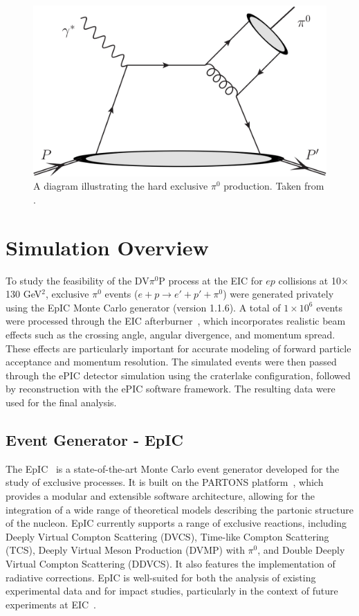 \documentclass[letterpaper,12pt]{article}
\begin{document}
\begin{figure}[h]
    \centering
    \includegraphics[scale=0.07]{Figures/exclusive_pi0_feynman.pdf}
    \caption{A diagram illustrating the hard exclusive $\pi^0$ production. Taken from \cite{PhysRevLett.133.051901}.}
\label{fig:dvpi0p}
\end{figure}

\section{Simulation Overview}\label{sec:Sim_Overview}
To study the feasibility of the DV$\pi^{0}$P process at the EIC for $ep$ collisions at 10$\times$130 GeV$^2$, exclusive $\pi^{0}$ events ($e + p \rightarrow e' + p' + \pi^0$) were generated privately using the EpIC Monte Carlo generator (version 1.1.6). A total of $1 \times 10^6$ events were processed through the EIC afterburner~\cite{afterburner_github}, which incorporates realistic beam effects such as the crossing angle, angular divergence, and momentum spread. These effects are particularly important for accurate modeling of forward particle acceptance and momentum resolution. The simulated events were then passed through the ePIC detector simulation using the craterlake configuration, followed by reconstruction with the ePIC software framework. The resulting data were used for the final analysis.

\subsection{Event Generator - EpIC}\label{subsec:EvGen}
The EpIC~\cite{Aschenauer:2022aeb, web_EpIC} is a state-of-the-art Monte Carlo event generator developed for the study of exclusive processes. It is built on the PARTONS platform~\cite{Berthou:2015oaw, link_to_PARTONS}, which provides a modular and extensible software architecture, allowing for the integration of a wide range of theoretical models describing the partonic structure of the nucleon. EpIC currently supports a range of exclusive reactions, including Deeply Virtual Compton Scattering (DVCS), Time-like Compton Scattering (TCS), Deeply Virtual Meson Production (DVMP) with $\pi^{0}$, and Double Deeply Virtual Compton Scattering (DDVCS). It also features the implementation of radiative corrections. EpIC is well-suited for both the analysis of existing experimental data and for impact studies, particularly in the context of future experiments at EIC~\cite{aschenauer2025studydeeplyvirtualcompton}.
\end{document}
